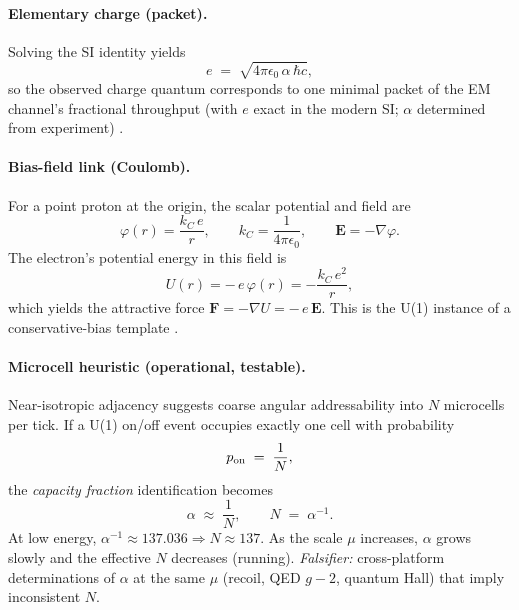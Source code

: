 \paragraph{Elementary charge (packet).}
Solving the SI identity yields
\begin{equation}
e \;=\; \sqrt{4\pi\epsilon_0\,\alpha\,\hbar c},
\end{equation}
so the observed charge quantum corresponds to one minimal packet of the EM channel's fractional throughput
(with \(e\) exact in the modern SI; \(\alpha\) determined from experiment) \cite{bipm2019si,tiesinga2021codata}.

\paragraph{Bias-field link (Coulomb).}
For a point proton at the origin, the scalar potential and field are
\begin{equation}
\varphi(r)=\frac{k_C\,e}{r},\qquad k_C=\frac{1}{4\pi\epsilon_0},\qquad
\mathbf E=-\nabla\varphi.
\end{equation}
The electron’s potential energy in this field is
\begin{equation}
U(r)=-\,e\,\varphi(r)=-\frac{k_C\,e^2}{r},
\end{equation}
which yields the attractive force \(\mathbf F=-\nabla U=-\,e\,\mathbf E\).
This is the U(1) instance of a conservative-bias template \cite{coulomb1785,griffiths2013electrodynamics}.

\paragraph{Microcell heuristic (operational, testable).}
Near-isotropic adjacency suggests coarse angular addressability into \(N\) microcells per tick.
If a U(1) on/off event occupies exactly one cell with probability
\begin{equation}
p_{\rm on} \;=\; \frac{1}{N},
\end{equation}
the \emph{capacity fraction} identification becomes
\begin{equation}
\alpha \;\approx\; \frac{1}{N}, \qquad N\;=\;\alpha^{-1}.
\end{equation}
At low energy, \(\alpha^{-1}\!\approx\!137.036 \Rightarrow N\!\approx\!137\).
As the scale \(\mu\) increases, \(\alpha\) grows slowly and the effective \(N\) decreases (running).
\emph{Falsifier:} cross-platform determinations of \(\alpha\) at the same \(\mu\) (recoil, QED \(g\!-\!2\), quantum Hall)
that imply inconsistent \(N\).


